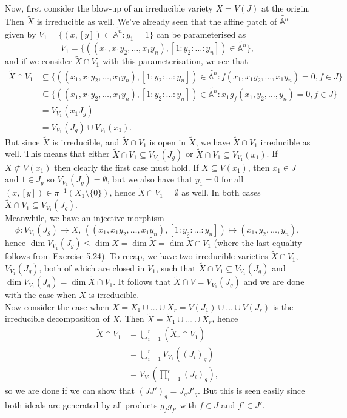 \documentclass{article}
\theoremstyle{definition}
\newcommand{\A}{\mathbb{A}}
\renewcommand{\AA}[1]{\A^{#1}}
\begin{document}
Now, first consider the blow-up of an irreducible variety $X = V(J)$ at the
origin. Then $\widetilde{X}$ is irreducible as well. We've already seen that
the affine patch of $\widetilde{\AA{n}}$ given by $V_1 = \{(x, [y]) \subset
\widetilde{\AA{n}} : y_1 = 1\}$ can be parameterised as 
\[
	V_1 = \{ ((x_1, x_1y_2, \ldots, x_1 y_n), [1:y_2:\ldots:y_n]) \in \widetilde{\AA{n}}\},
\]
and if we consider $\widetilde{X} \cap V_1$ with this parameterisation,
we see that 
\begin{align*}
	\widetilde{X} \cap V_1
	&\subseteq
	\{
		((x_1, x_1y_2, \ldots, x_1 y_n), [1:y_2:\ldots:y_n]) 
		\in 
		\widetilde{\AA{n}}
		:
		f(x_1, x_1y_2, \ldots, x_1 y_n) = 0,
		f \in J
	\} \\
	&\subseteq
	\{
		((x_1, x_1y_2, \ldots, x_1 y_n), [1:y_2:\ldots:y_n]) 
		\in 
		\widetilde{\AA{n}}
		:
		x_1 g_f(x_1, y_2, \ldots, y_n) = 0, 
		f \in J
	\} \\
	&=
	V_{V_1}(x_1J_g) \\
	&=
	V_{V_1}(J_g) \cup V_{V_1}(x_1).
\end{align*}
But since $\widetilde{X}$ is irreducible, and $\widetilde{X} \cap V_1$ is open
in $\widetilde{X}$, we have $\widetilde{X} \cap V_1$ irreducible as well. This
means that either $\widetilde{X} \cap V_1 \subseteq V_{V_1}(J_g)$ or
$\widetilde{X} \cap V_1 \subseteq V_{V_1}(x_1)$. If $X \not \subset V(x_1)$
then clearly the first case must hold. If $X \subseteq V(x_1)$, then $x_1 \in
J$ and $1 \in J_g$ so $V_{V_1}(J_g) = \emptyset$, but we also have that $y_1 =
0$ for all $(x, [y]) \in \pi^{-1}(X_1 \setminus \{0\})$, hence $\widetilde{X}
\cap V_1 = \emptyset$ as well. In both cases $\widetilde{X} \cap V_1 \subseteq
V_{V_1}(J_g)$. \\

Meanwhile, we have an injective morphism 
\[
	\phi : V_{V_1}(J_g) \to X, \,
	((x_1, x_1y_2, \ldots, x_1 y_n), [1:y_2:\ldots:y_n]) 
	\mapsto 
	(x_1, y_2, \ldots, y_n),
\] 
hence $\dim V_{V_1}(J_g) \leq \dim X = \dim \widetilde{X} = \dim \widetilde{X}
\cap V_1$ (where the last equality follows from Exercise 5.24). To recap, we
have two irreducible varieties $\widetilde{X} \cap V_1$, $V_{V_1}(J_g)$, both
of which are closed in $V_1$, such that $\widetilde{X} \cap V_1 \subseteq
V_{V_1}(J_g)$ and $\dim V_{V_1}(J_g) = \dim \widetilde{X} \cap V_1$. It follows
that $\widetilde{X} \cap V = V_{V_1}(J_g)$ and we are done with the case when
$X$ is irreducible. \\

Now consider the case when $X = X_1 \cup \ldots \cup X_r = V(J_1) \cup \ldots
\cup V(J_r)$ is the irreducible decomposition of $X$. Then $\widetilde{X} =
\widetilde{X_1} \cup \ldots \cup \widetilde{X_r}$, hence 
\begin{align*}
	\widetilde{X} \cap V_1
	&=
	\bigcup_{i = 1}^{r} 
	(\widetilde{X}_r \cap V_1) \\
	&=
	\bigcup_{i = 1}^{r} 
	V_{V_1}((J_i)_g) \\
	&=
	V_{V_1}\left(
	\prod_{i = 1}^{r} 
	(J_i)_g
	\right),
\end{align*} 
so we are done if we can show that $(JJ')_g = J_gJ'_g$. But this is seen easily
since both ideals are generated by all products $g_{f} g_{f'}$ with $f \in J$
and $f' \in J'$. 
\end{document}

